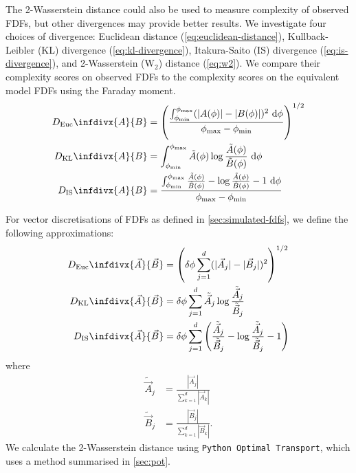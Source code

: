         The 2-Wasserstein distance could also be used to measure complexity of observed FDFs, but other divergences may provide better results. We investigate four choices of divergence: Euclidean distance (\autoref{eq:euclidean-distance}), Kullback-Leibler (KL) divergence (\autoref{eq:kl-divergence}), Itakura-Saito (IS) divergence (\autoref{eq:is-divergence}), and 2-Wasserstein (W$_2$) distance (\autoref{eq:w2}). We compare their complexity scores on observed FDFs to the complexity scores on the equivalent model FDFs using the Faraday moment.
        \begin{align}
          \label{eq:euclidean-distance}
          D_{\mathrm{Euc}}\infdivx{A}{B} &= \left(\frac{\int_{\phi_{\min}}^{\phi_{\max}} (|A(\phi)| - |B(\phi)|)^2\ \mathrm{d}\phi}{\phi_{\max}-\phi_{\min}}\right)^{1/2}\\
          \label{eq:kl-divergence}
          D_{\mathrm{KL}}\infdivx{A}{B} &= \int_{\phi_{\min}}^{\phi_{\max}} \tilde A(\phi) \log \frac{\tilde A(\phi)}{\tilde B(\phi)}\ \mathrm{d}\phi\\
          \label{eq:is-divergence}
          D_{\mathrm{IS}}\infdivx{A}{B} &= \frac{\int_{\phi_{\min}}^{\phi_{\max}} \frac{\tilde A(\phi)}{\tilde B(\phi)} - \log \frac{\tilde A(\phi)}{\tilde B(\phi)} - 1\ \mathrm{d}\phi}{\phi_{\max}-\phi_{\min}}
        \end{align}

        For vector discretisations of FDFs as defined in \autoref{sec:simulated-fdfs}, we define the following approximations:
        \begin{align}
          \label{eq:euclidean-distance-discrete}
          D_{\mathrm{Euc}}\infdivx{\vec A}{\vec B} &= \left(\delta\phi \sum_{j = 1}^d (|\vec A_j| - |\vec B_j|)^2\right)^{1/2}\\
          \label{eq:kl-divergence-discrete}
          D_{\mathrm{KL}}\infdivx{\vec A}{\vec B} &= \delta\phi \sum_{j = 1}^d \tilde{\vec A}_j \log \frac{\tilde{\vec A}_j}{\tilde{\vec B}_j}\\
          \label{eq:is-divergence-discrete}
          D_{\mathrm{IS}}\infdivx{\vec A}{\vec B} &= \delta\phi \sum_{j = 1}^d \left(\frac{\tilde{\vec A}_j}{\tilde{\vec B}_j} - \log \frac{\tilde{\vec A}_j}{\tilde{\vec B}_j} - 1\right)
        \end{align}
        where
        \begin{align}
          \tilde{\vec A}_j &= \frac{|\vec A_j|}{\sum_{k = 1}^d |\vec A_k|}\\
          \tilde{\vec B}_j &= \frac{|\vec B_j|}{\sum_{k = 1}^d |\vec B_k|}.
        \end{align}
        We calculate the 2-Wasserstein distance using \texttt{Python Optimal Transport}, which uses a method summarised in \autoref{sec:pot}.

